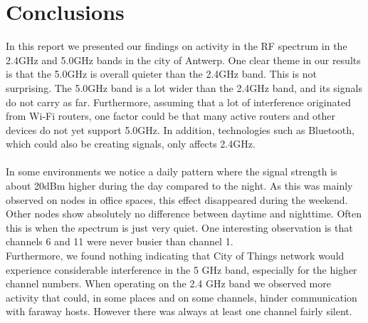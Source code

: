 \documentclass[a4paper, 11pt]{article}
\begin{document}
\section{Conclusions}
In this report we presented our findings on activity in the RF spectrum in the 2.4GHz and 5.0GHz bands in the city of Antwerp. One clear theme in our results is that the 5.0GHz is overall quieter than the 2.4GHz band. This is not surprising. The 5.0GHz band is a lot wider than the 2.4GHz band, and its signals do not carry as far. Furthermore, assuming that a lot of interference originated from Wi-Fi routers, one factor could be that many active routers and other devices do not yet support 5.0GHz. In addition, technologies such as Bluetooth, which could also be creating signals, only affects 2.4GHz.\\ \\
In some environments we notice a daily pattern where the signal strength is about 20dBm higher during the day compared to the night. As this was mainly observed on nodes in office spaces, this effect disappeared during the weekend. Other nodes show absolutely no difference between daytime and nighttime. Often this is when the spectrum is just very quiet. One interesting observation is that channels 6 and 11 were never busier than channel 1. \\
Furthermore, we found nothing indicating that City of Things network would experience considerable interference in the 5 GHz band, especially for the higher channel numbers. When operating on the 2.4 GHz band we observed more activity that could, in some places and on some channels, hinder communication with faraway hosts. However there was always at least one channel fairly silent.






\end{document}
